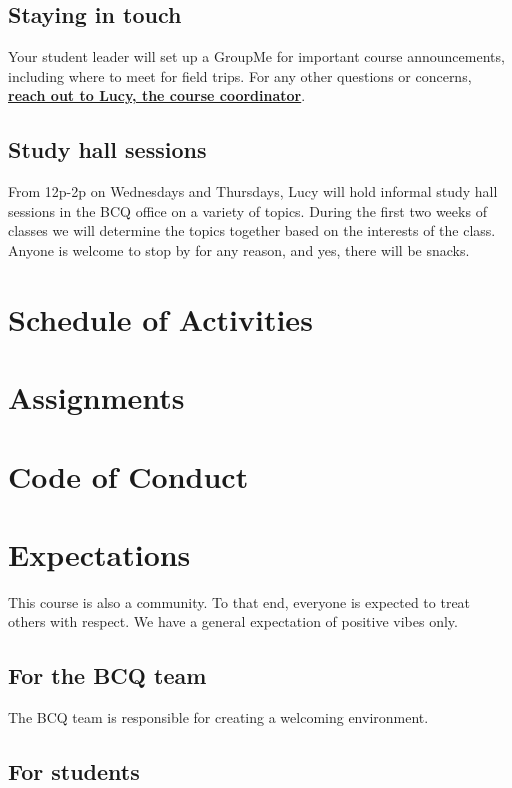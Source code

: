 \documentclass[12pt]{article}
\let\oldhref\href
\renewcommand{\href}[2]{\oldhref{#1}{\bfseries#2}}
\begin{document}
\subsection{Staying in touch}

Your student leader will set up a GroupMe for important course announcements, including where to meet for field trips. For any other questions or concerns, \href{mailto:ldelan5@uic.edu}{reach out to Lucy, the course coordinator}.

\subsection{Study hall sessions}

From 12p-2p on Wednesdays and Thursdays, Lucy will hold informal study hall sessions in the BCQ office on a variety of topics. During the first two weeks of classes we will determine the topics together based on the interests of the class. Anyone is welcome to stop by for any reason, and yes, there will be snacks.

\section{Schedule of Activities}

\section{Assignments}

\section{Code of Conduct}

\section{Expectations}

This course is also a community. To that end, everyone is expected to treat others with respect. We have a general expectation of positive vibes only.

\subsection{For the BCQ team}

The BCQ team is responsible for creating a welcoming environment. 

\subsection{For students}
\end{document}
